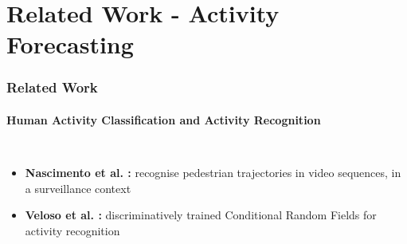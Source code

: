 \section{Related Work - Activity Forecasting}

\begin{frame}
	\frametitle{Related Work}
	\framesubtitle{Human Activity Classification and Activity Recognition}
	
	\vspace{0.4cm}
	
	\begin{columns}[T]
		
		\vspace{0.2cm}
		
		\begin{itemize}
			\item \textbf{Nascimento {et al.} \cite{Nascimento10}:} recognise pedestrian trajectories in
				  video sequences, in a surveillance context
			
			\vspace{1.2cm}
			
			\item \textbf{Veloso {et al.} \cite{Vail07}:} discriminatively trained Conditional Random
				  Fields for activity recognition
		\end{itemize}
		
		
		\centering
	\end{columns}
	

\end{frame}

